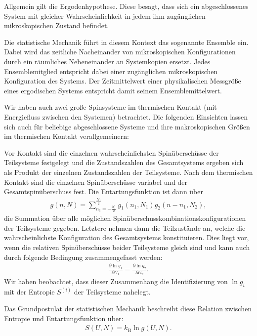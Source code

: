 \begin{summary}
    Allgemein gilt die Ergodenhypothese. Diese besagt, dass sich ein abgeschlossenes System mit gleicher Wahrscheinlichkeit in jedem ihm zugänglichen mikroskopischen Zustand befindet.

    Die statistische Mechanik führt in diesem Kontext das sogenannte Ensemble ein. Dabei wird das zeitliche Nacheinander von mikroskopischen Konfigurationen durch ein räumliches Nebeneinander an Systemkopien ersetzt. Jedes Ensemblemitglied entspricht dabei einer zugänglichen mikroskopischen Konfiguration des Systems. Der Zeitmittelwert einer physikalischen Messgröße eines ergodischen Systems entspricht damit seinem Ensemblemittelwert.
   
    Wir haben auch zwei große Spinsysteme im thermischen Kontakt (mit Energiefluss zwischen den Systemen) betrachtet. Die folgenden Einsichten lassen sich auch für beliebige abgeschlossene Systeme und ihre makroskopischen Größen im thermischen Kontakt verallgemeinern:

    Vor Kontakt sind die einzelnen wahrscheinlichsten Spinüberschüsse der Teilsysteme festgelegt und die Zustandszahlen des Gesamtsystems ergeben sich als Produkt der einzelnen Zustandszahlen der Teilsysteme. Nach dem thermischen Kontakt sind die einzelnen Spinüberschüsse variabel und der Gesamtspinüberschuss fest. Die Entartungsfunktion ist dann über 
    \begin{align*}
        g(n,N) = \sum_{n_1=-\frac{N_1}{2}}^{\frac{N_1}{2}} g_1(n_1,N_1)g_2(n-n_1,N_2),
    \end{align*}
    die Summation über alle möglichen Spinüberschusskombinationskonfigurationen der Teilsysteme gegeben. 
    Letztere nehmen dann die Teilzustände an, welche die wahrscheinlichste Konfiguration des Gesamtsystems konstituieren. Dies liegt vor, wenn die relativen Spinüberschüsse beider Teilsysteme gleich sind und kann auch durch folgende Bedingung zusammengefasst werden:
    \begin{align}
        \frac{\partial \ln g_1}{\partial U_1}  = \frac{\partial \ln g_2}{\partial U_2}.
    \end{align}
    Wir haben beobachtet, dass dieser Zusammenhang die Identifizierung von $\ln g_i$ mit der Entropie $S^{(i)}$ der Teilsysteme nahelegt.
    
    Das Grundpostulat der statistischen Mechanik beschreibt diese Relation zwischen Entropie und Entartungsfunktion über: 
    \begin{align*}
        S(U,N)=k_\mathrm{B}\ln g(U,N).
    \end{align*}


\end{summary}
